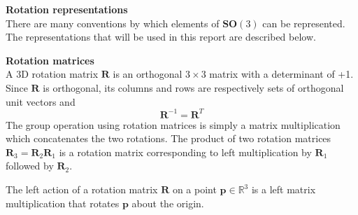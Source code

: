 		\begin{comment}
		\textbf{Adjoint map}\\
		EXPLANATION???? Hard to explain practical application without discussing reference frames: ie if position defined in body fixed frame but some other transformation defined in inertial frame. First undo rotation to get pose in inertial frame, apply transformation, then re-apply rotation.
		\begin{equation}
			\Psi_R: \mathbf{SO}(3) \rightarrow \mathbf{SO}(3) \textnormal{, }
			\Psi_R(A) \stackrel{\Delta}{=} RAR^{-1}
		\end{equation}
		Taking the derivative:
		\begin{equation}
			\frac{\partial}{\partial t} \Psi_R(A(t))|_{t=0} = RBR^{-1} \textnormal{, }
			B \stackrel{\Delta}{=} 	\frac{\partial}{\partial t}A(t)|_{t=0}
		\end{equation}
		The adjoint	representation of $\mathbf{SO}(3)$ is given by the mapping
		\begin{equation}
			\textbf{Adj}_R: \mathfrak{so}(3) \rightarrow \mathfrak{so}(3) \textnormal{, }
			\textbf{Adj}_R(B) \stackrel{\Delta}{=} RBR^{-1}
		\end{equation}
		\end{comment}
		
		\textbf{Rotation representations}\\		
		There are many conventions by which elements of $\mathbf{SO}(3)$ can be represented. The representations that will be used in this report are described below.
		
		\textbf{Rotation matrices}\\
		A 3D rotation matrix $\mathbf{R}$ is an orthogonal $3 \times 3$ matrix with a determinant of +1. Since $\mathbf{R}$ is orthogonal, its columns and rows are respectively sets of orthogonal unit vectors and
		\begin{equation}
			\mathbf{R}^{-1} = \mathbf{R}^{T}
		\end{equation}		
		The group operation using rotation matrices is simply a matrix multiplication which concatenates the two rotations. The product of two rotation matrices $\mathbf{R}_3 = \mathbf{R}_2\mathbf{R}_1$ is a rotation matrix corresponding to left multiplication by $\mathbf{R}_1$ followed by $\mathbf{R}_2$.
		
		The left action of a rotation matrix $\mathbf{R}$ on a point $\mathbf{p} \in \mathbb{R}^3$ is a left matrix multiplication that rotates $\mathbf{p}$ about the origin.
		
